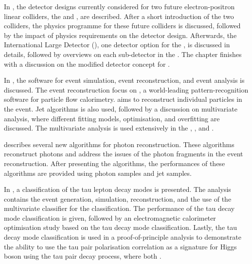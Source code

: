 In , the detector designs currently considered for two future electron-positron linear colliders, the \ILC and \CLIC, are described. After a short introduction of the two colliders, the physics programme for these future colliders is discussed, followed by the impact of physics requirements on the detector design. Afterwards, the International Large Detector (\ILD), one detector option for the \ILC, is discussed in details, followed by overviews on each sub-detector in the \ILD. The chapter finishes with a discussion on the modified \ILD detector concept for \CLIC.

In , the software for event simulation, event reconstruction, and event analysis is  discussed. The event reconstruction focus on \pandora, a world-leading pattern-recognition software for particle flow calorimetry. \pandora aims to reconstruct individual particles in the event. Jet algorithms is also used, followed by a discussion on  multivariate analysis, where different fitting models, optimisation, and overfitting are discussed. The multivariate analysis is used extensively in the , , and .



 describes several new \pandora algorithms for photon reconstruction. These algorithms reconstruct photons and address the issues of the photon fragments in the event reconstruction. After presenting the algorithms, the performances of these algorithms are provided using photon samples and jet samples. 

In , a classification of the tau lepton decay modes is presented. The analysis contains the event generation, simulation, reconstruction, and the use of the multivariate classifier for the classification.  The performance of the tau decay mode classification is given, followed by an electromagnetic calorimeter optimisation study based on the tau decay mode classification. Lastly, the  tau decay mode classification is used in a proof-of-principle analysis to demonstrate the ability to use the tau pair polarisation correlation as a signature for Higgs boson using the tau pair decay process, where both \tauToPion.

